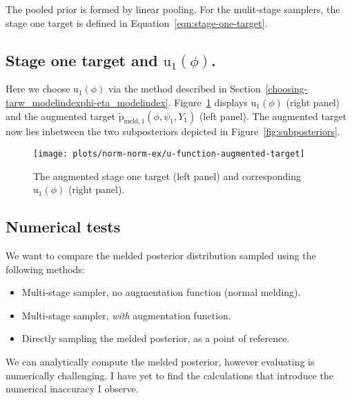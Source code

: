 \documentclass[10pt,a4paper,]{article}
\providecommand{\tightlist}{%
  \setlength{\itemsep}{0pt}\setlength{\parskip}{0pt}}
\newcommand{\pd}{\text{p}}
\begin{document}
The pooled prior is formed by linear pooling. For the mulit-stage
samplers, the stage one target is defined in
Equation~\eqref{eqn:stage-one-target}.

\subsection{\texorpdfstring{Stage one target and
\(\text{u}_{1}(\phi)\).}{Stage one target and \textbackslash{}text\{u\}\_\{1\}(\textbackslash{}phi).}}\label{stage-one-target-and-textu_1phi.}

Here we choose \(\text{u}_{1}(\phi)\) via the method described in
Section~\ref{choosing-tarw_modelindexphi-eta_modelindex}.
Figure~\ref{fig:u_func_augmented_target} displays \(\text{u}_{1}(\phi)\)
(right panel) and the augmented target
\(\tilde{\pd}_{\text{meld}, 1}(\phi, \psi_{1}, Y_{1})\) (left panel).
The augmented target now lies inbetween the two subposteriors depicted
in Figure~\ref{fig:subposteriors}.

\begin{figure}

{\centering \texttt{[image: plots/norm-norm-ex/u-function-augmented-target]} 

}

\caption{The augmented stage one target (left panel) and corresponding $\text{u}_{1}(\phi)$ (right panel).}\label{fig:u_func_augmented_target}
\end{figure}

\subsection{Numerical tests}\label{numerical-tests}

We want to compare the melded posterior distribution sampled using the
following methods:

\begin{itemize}
\tightlist
\item
  Multi-stage sampler, no augmentation function (normal melding).
\item
  Multi-stage sampler, \emph{with} augmentation function.
\item
  Directly sampling the melded posterior, as a point of reference.
\end{itemize}

We can analytically compute the melded posterior, however evaluating is
numerically challenging. I have yet to find the calculations that
introduce the numerical inaccuracy I observe.
\end{document}

